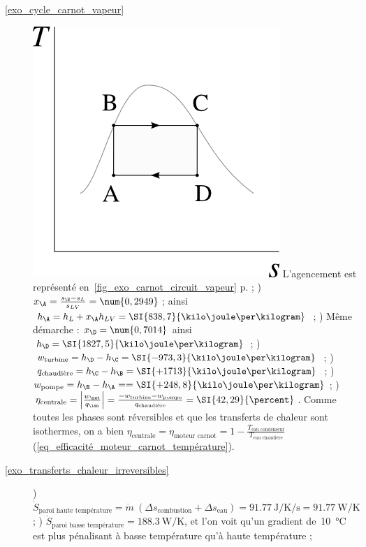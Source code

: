 \begin{description}
		\item [\ref{exo_cycle_carnot_vapeur}]
						\includegraphics[width=\solutiondiagramwidth]{images/exo_sol_ts_carnot_vapeur1.png}
						\tab L’agencement est représenté en~\cref{fig_exo_carnot_circuit_vapeur} p.\pageref{fig_exo_carnot_circuit_vapeur} ;
						\tab{}) $x_\A = \frac{s_\B - s_L}{s_{LV}} = \num{0,2949}$ ; ainsi $h_\A = h_L + x_\A h_{LV} = \SI{838,7}{\kilo\joule\per\kilogram}$ ;
						) Même démarche : $x_\D = \num{0,7014}$ ainsi $h_\D = \SI{1827,5}{\kilo\joule\per\kilogram}$ ;
						) $w_\text{turbine} = h_\D - h_\C = \SI{-973,3}{\kilo\joule\per\kilogram}$ ;
						) $q_\text{chaudière} = h_\C - h_\B = \SI{+1713}{\kilo\joule\per\kilogram}$ ;
						) $w_\text{pompe} = h_\B - h_\A =  = \SI{+248,8}{\kilo\joule\per\kilogram}$ ;
						) $\eta_\text{centrale} = \left|\frac{w_\net}{q_\inn}\right| = \frac{-w_\text{turbine} - w_\text{pompe}}{q_\text{chaudière}} = \SI{42,29}{\percent}$. Comme toutes les phases sont réversibles et que les transferts de chaleur sont isothermes, on a bien $\eta_\text{centrale} = \eta_\text{moteur carnot} = 1 - \frac{T_\text{eau condenseur}}{T_\text{eau chaudière}}$ (\ref{eq_efficacité_moteur_carnot_température}).
		\item [\ref{exo_transferts_chaleur_irreversibles}]
						) $\dot{S}_\text{paroi haute température} = \dot{m} \ (\Delta s_\text{combustion} + \Delta s_\text{eau}) = \SI[per-mode = symbol]{+91,77}{\joule\per\kelvin\per\second} = \SI{+91,77}{\watt\per\kelvin}$ ;
						) $\dot{S}_\text{paroi basse\ température} = \SI{+188,3}{\watt\per\kelvin}$, et l’on voit qu’un gradient de~\SI{10}{\degreeCelsius} est plus pénalisant à basse température qu’à haute température ;

\end{description}
